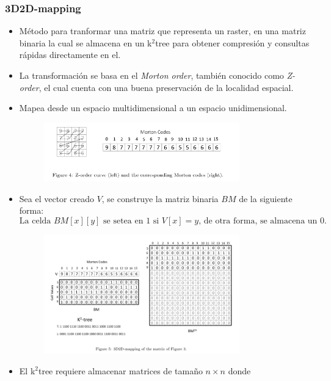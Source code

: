 \documentclass{article}
\begin{document}
\subsubsection*{3D2D-mapping}
\begin{itemize}
  \item Método para tranformar una matriz que representa un raster, en una matriz
    binaria la cual se almacena en un k$^2$tree para obtener compresión y
    consultas rápidas directamente en el.
  \item La transformación se basa en el \emph{Morton order}, también conocido
    como \emph{Z-order}, el cual cuenta con una buena preservación de la
    localidad espacial.
  \item Mapea desde un espacio multidimensional a un espacio unidimensional.
    \begin{figure}[h]
      \centering
      \includegraphics[width=0.8\textwidth]{../images/morton.png}
    \end{figure}
  \item Sea el vector creado $V$, se construye la matriz binaria $BM$ de la
    siguiente forma: \\
    \[
      \text{La celda } BM[x][y] \text{ se setea en 1 si } V[x] = y
      \text{, de otra forma, se almacena un 0}
    .\]
    \begin{figure}[h]
      \centering
      \includegraphics[width=0.8\textwidth]{../images/3d2d.png}
    \end{figure}
  \item El k$^2$tree requiere almacenar matrices de tamaño $n \times n$ donde

\end{itemize}
\end{document}
